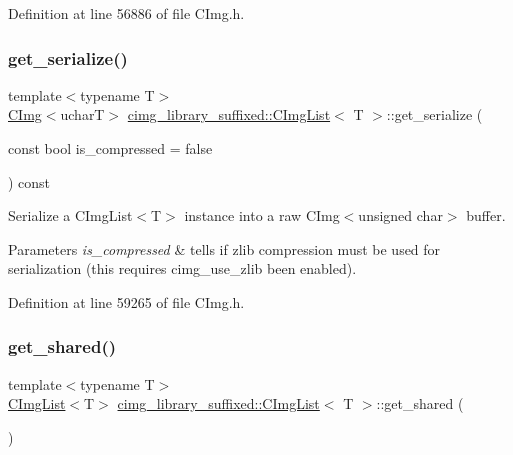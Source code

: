 Definition at line 56886 of file C\+Img.\+h.

\mbox{\label{structcimg__library__suffixed_1_1CImgList_a6ef5394483360f2220873d2b8b856789}} 
\subsubsection{\texorpdfstring{get\+\_\+serialize()}{get\_serialize()}}
{\footnotesize\ttfamily template$<$typename T$>$ \\
\hyperlink{structcimg__library__suffixed_1_1CImg}{C\+Img}$<$ucharT$>$ \hyperlink{structcimg__library__suffixed_1_1CImgList}{cimg\+\_\+library\+\_\+suffixed\+::\+C\+Img\+List}$<$ T $>$\+::get\+\_\+serialize (\begin{DoxyParamCaption}\item[{const bool}]{is\+\_\+compressed = {\ttfamily false} }\end{DoxyParamCaption}) const\hspace{0.3cm}{\ttfamily [inline]}}



Serialize a C\+Img\+List$<$\+T$>$ instance into a raw C\+Img$<$unsigned char$>$ buffer. 


\begin{DoxyParams}{Parameters}
{\em is\+\_\+compressed} & tells if zlib compression must be used for serialization (this requires \textquotesingle{}cimg\+\_\+use\+\_\+zlib\textquotesingle{} been enabled). \\
\hline
\end{DoxyParams}


Definition at line 59265 of file C\+Img.\+h.

\mbox{\label{structcimg__library__suffixed_1_1CImgList_a60bac5909029428b39ffc726b5f25079}} 
\subsubsection{\texorpdfstring{get\+\_\+shared()}{get\_shared()}}
{\footnotesize\ttfamily template$<$typename T$>$ \\
\hyperlink{structcimg__library__suffixed_1_1CImgList}{C\+Img\+List}$<$T$>$ \hyperlink{structcimg__library__suffixed_1_1CImgList}{cimg\+\_\+library\+\_\+suffixed\+::\+C\+Img\+List}$<$ T $>$\+::get\+\_\+shared (\begin{DoxyParamCaption}{ }\end{DoxyParamCaption})\hspace{0.3cm}{\ttfamily [inline]}}



